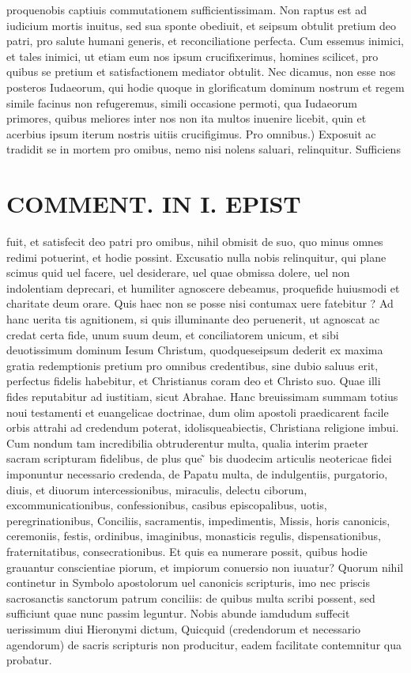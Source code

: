 \documentclass{article}
\begin{document}
\begin{pages}
proquenobis captiuis commutationem sufficientissimam. Non raptus est ad iudicium mortis inuitus, sed sua sponte obediuit, et seipsum obtulit pretium deo patri, pro salute humani generis, et reconciliatione perfecta. Cum essemus inimici, et tales inimici, ut etiam eum nos ipsum crucifixerimus, homines scilicet, pro quibus se pretium et satisfactionem mediator obtulit. Nec dicamus, non esse nos posteros Iudaeorum, qui hodie quoque  in glorificatum dominum nostrum et regem simile facinus non refugeremus, simili occasione permoti, qua Iudaeorum primores, quibus meliores inter nos non ita multos inuenire licebit, quin et acerbius ipsum iterum nostris uitiis crucifigimus. Pro omnibus.) Exposuit ac tradidit se in mortem pro omibus, nemo nisi nolens saluari, relinquitur. Sufficiens  \pend
\section*{COMMENT. IN I. EPIST }
\marginpar{[ p.484 ]}\pstart fuit, et satisfecit deo patri pro omibus, nihil obmisit de suo, quo minus omnes redimi potuerint, et hodie possint. Excusatio nulla nobis relinquitur, qui plane scimus quid uel facere, uel desiderare, uel quae obmissa dolere, uel non indolentiam deprecari, et humiliter agnoscere debeamus, proquefide huiusmodi et charitate deum orare. Quis haec non se posse nisi contumax uere fatebitur ? Ad hanc uerita tis agnitionem, si quis illuminante deo peruenerit, ut agnoscat ac credat certa fide, unum suum deum, et conciliatorem unicum, et sibi deuotissimum dominum Iesum Christum, quodqueseipsum dederit ex maxima gratia redemptionis pretium pro omnibus credentibus, sine dubio saluus erit, perfectus fidelis habebitur, et Christianus coram deo et Christo suo. Quae illi fides reputabitur ad iustitiam, sicut Abrahae. Hanc breuissimam summam totius noui testamenti et euangelicae doctrinae, dum olim apostoli praedicarent facile orbis attrahi ad credendum poterat, idolisqueabiectis, Christiana religione imbui. Cum nondum tam incredibilia obtruderentur multa, qualia interim praeter sacram scripturam fidelibus, de plus que ̃ bis duodecim articulis neotericae fidei imponuntur necessario credenda, de Papatu multa, de indulgentiis, purgatorio, diuis, et diuorum intercessionibus, miraculis, delectu ciborum, excommunicationibus, confessionibus, casibus episcopalibus, uotis, peregrinationibus, Conciliis, sacramentis, impedimentis, Missis, horis canonicis, ceremoniis, festis, ordinibus, imaginibus, monasticis regulis, dispensationibus, fraternitatibus, consecrationibus. Et quis ea numerare possit, quibus hodie grauantur conscientiae piorum, et impiorum conuersio non iuuatur? Quorum nihil continetur in Symbolo apostolorum uel canonicis scripturis, imo nec priscis sacrosanctis sanctorum patrum conciliis: de quibus multa scribi possent, sed sufficiunt quae nunc passim leguntur. Nobis abunde iamdudum suffecit uerissimum diui Hieronymi dictum, Quicquid (credendorum et necessario agendorum) de sacris scripturis non producitur, eadem facilitate contemnitur qua probatur.  \pend
{}
{}

\end{pages}
\end{document}
